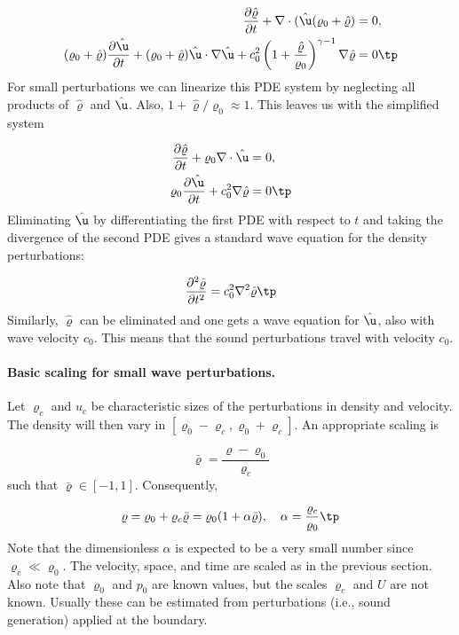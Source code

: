 \documentclass[graybox,envcountchap,sectrefs,final]{svmonodo}
\begin{document}
\begin{align*}
\frac{\partial\hat\varrho}{\partial t} + \nabla\cdot(\hat\u(\varrho_0 + \hat\varrho) &=0,\\ 
(\varrho_0 + \hat\varrho)
\frac{\partial\hat\u}{\partial t} + (\varrho_0+\hat\varrho)\hat\u\cdot\nabla\hat\u +
c_0^2\left(1 + \frac{\hat\varrho}{\varrho_0}\right)^{\gamma-1}\nabla\hat\varrho &=0\tp
\end{align*}
For small perturbations we can linearize this PDE system by
neglecting all products of $\hat\varrho$ and
$\hat\u$. Also, $1 + \hat\varrho/\varrho_0\approx 1$.
This leaves us with the simplified system

\begin{align*}
\frac{\partial\hat\varrho}{\partial t} + \varrho_0\nabla\cdot\hat\u &=0,\\ 
\varrho_0\frac{\partial\hat\u}{\partial t} +
c_0^2\nabla\hat\varrho &=0\tp
\end{align*}
Eliminating $\hat\u$ by differentiating the first PDE with respect to $t$
and taking the divergence of the second PDE gives a standard wave equation
for the density perturbations:

\[ \frac{\partial^2\hat\varrho}{\partial t^2} = c_0^2\nabla^2\hat\varrho\tp\]
Similarly, $\hat\varrho$ can be eliminated and one gets a wave equation for
$\hat\u$, also with wave velocity $c_0$.
This means that the sound perturbations travel with velocity $c_0$.


\paragraph{Basic scaling for small wave perturbations.}
Let $\varrho_c$ and
$u_c$ be characteristic sizes of the perturbations in density and velocity.
The density will then vary in $[\varrho_0-\varrho_c,\varrho_0+\varrho_c]$.
An appropriate scaling is

\[ \bar\varrho =\frac{\varrho - \varrho_0}{\varrho_c} \]
such that $\bar\varrho\in [-1,1]$. Consequently,

\[ \varrho = \varrho_0 + \varrho_c\bar\varrho = \varrho_0(1 + \alpha\bar\varrho),\quad \alpha = \frac{\varrho_c}{\varrho_0}\tp\]
Note that the dimensionless $\alpha$ is expected to be a very small number
since $\varrho_c\ll \varrho_0$.
The velocity, space, and time are scaled as in the previous
section.
Also note that $\varrho_0$ and $p_0$ are known values, but the scales
$\varrho_c$ and $U$ are not known. Usually these
can be estimated from perturbations (i.e., sound generation)
applied at the boundary.
\end{document}
